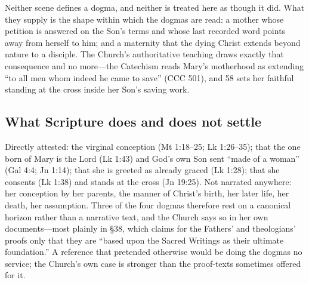 Neither scene defines a dogma, and neither is treated here as though it
did. What they supply is the shape within which the dogmas are read: a
mother whose petition is answered on the Son's terms and whose last
recorded word points away from herself to him; and a maternity that the
dying Christ extends beyond nature to a disciple. The Church's
authoritative teaching draws exactly that consequence and no more---the
Catechism reads Mary's motherhood as extending ``to all men whom indeed
he came to save'' (CCC 501), and  58 sets her
faithful standing at the cross inside her Son's saving work.

\subsection*{What Scripture does and does not settle}

Directly attested: the virginal conception (Mt 1:18--25; Lk 1:26--35);
that the one born of Mary is the Lord (Lk 1:43) and God's own Son sent
``made of a woman'' (Gal 4:4; Jn 1:14); that she is greeted as already
graced (Lk 1:28); that she consents (Lk 1:38) and stands at the cross
(Jn 19:25). Not narrated anywhere: her conception by her parents, the
manner of Christ's birth, her later life, her death, her assumption.
Three of the four dogmas therefore rest on a canonical horizon rather
than a narrative text, and the Church says so in her own documents---most
plainly in  \S38, which claims for the Fathers' and theologians'
proofs only that they are ``based upon the Sacred Writings as their
ultimate foundation.'' A reference that pretended
otherwise would be doing the dogmas no service; the Church's own case is
stronger than the proof-texts sometimes offered for it.

